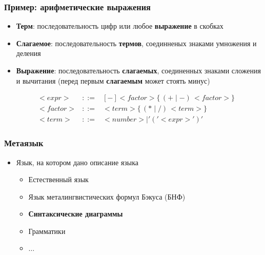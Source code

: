 \documentclass{beamer}
\begin{document}
\begin{frame}[fragile]
  \transwipe[direction=90]
  \frametitle{Пример: арифметические выражения}

  \begin{itemize}
    \item \textbf{Терм}: последовательность цифр или любое \textbf{выражение} в скобках
    \item \textbf{Слагаемое}: последовательность \textbf{термов}, соединненых знаками умножения и деления
    \item \textbf{Выражение}: последовательность \textbf{слагаемых}, соединенных знаками сложения и вычитания (перед первым \textbf{слагаемым} может стоять минус)
  \end{itemize}  
  
\[
\begin{array}{crcl}
&<expr>& ::= & [-] <factor> \{ \, ( + \mid - ) \, <factor> \} \\
&<factor>& ::= & <term> \{ \, (* \mid /) \, <term> \} \\
&<term>& ::= & <number> \mid '(' <expr> ')'
\end{array}
\]

\end{frame}

\begin{frame}[fragile]
  \transwipe[direction=90]
  \frametitle{Метаязык}
  \begin{itemize}
    \item Язык, на котором дано описание языка
    \begin{itemize}
      \item Естественный язык
      \item Язык металингвистических формул Бэкуса (БНФ)
      \item \textbf{Синтаксические диаграммы}
      \item Грамматики
      \item $\dots$
    \end{itemize}
  \end{itemize}
\end{frame}
\end{document}

